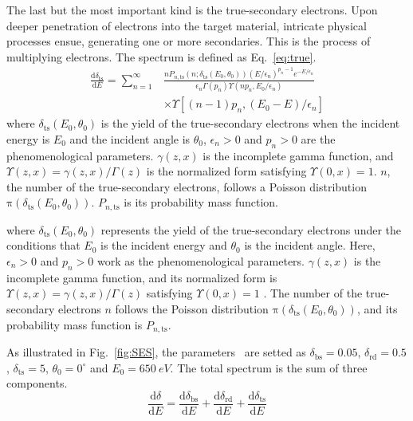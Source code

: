 The last but the most important kind is the true-secondary electrons.
Upon deeper penetration of electrons into the target material, intricate physical processes ensue,
generating one or more secondaries.
This is the process of multiplying electrons.
The spectrum is defined as Eq.~\eqref{eq:true}.
\begin{equation}
	\label{eq:true}
	\begin{aligned}
		\frac{\mathrm{d} \delta_{\mathrm{ts}}}{\mathrm{d} E} =  \sum_{n=1}^{\infty}
		 & \frac{n P_{n,\mathrm{ts}}\left(n; \delta_{\mathrm{ts}}(E_0,\theta_0)\right)
		\left(E / \epsilon_{n}\right)^{p_{n}-1} e^{-E / \epsilon_{n}}}
		{\epsilon_{n} \Gamma\left(p_{n}\right) \Upsilon\left(n p_{n}, E_0 / \epsilon_{n}\right)} \\
		 & \times \Upsilon\left[(n-1) p_{n},\left(E_0-E\right) / \epsilon_{n}\right]
	\end{aligned}
\end{equation}
where $\delta_{\mathrm{ts}}(E_0,\theta_0)$
is the yield of the true-secondary electrons when the incident energy is $E_0$ and the incident angle is $\theta_0$,
$\epsilon_{n}>0$ and $p_{n}>0$ are the phenomenological parameters.
$\gamma(z,x)$ is the incomplete gamma function,
and $\Upsilon(z,x)=\gamma(z,x)/\Gamma(z)$ is the normalized form satisfying $\Upsilon(0,x)=1$.
$n$, the number of the true-secondary electrons, follows a Poisson distribution~$\mathrm{\pi}(\delta_{\mathrm{ts}}(E_0,\theta_0))$.
$P_{n,\mathrm{ts}}$ is its probability mass function.

where $\delta_{\mathrm{ts}}(E_0,\theta_0)$ represents the yield of the true-secondary electrons under the conditions that $E_0$ is the incident energy and $\theta_0$ is the incident angle. Here, $\epsilon_{n}>0$ and $p_{n}>0$ work as the phenomenological parameters. $\gamma(z,x)$ is the incomplete gamma function, and its normalized form is $\Upsilon(z,x)=\gamma(z,x)/\Gamma(z)$ satisfying $\Upsilon(0,x)=1$ . The number of the true-secondary electrons $n$ follows the Poisson distribution $\mathrm{\pi}(\delta_{\mathrm{ts}}(E_0,\theta_0))$, and its probability mass function is $P_{n,\mathrm{ts}}$.

As illustrated in Fig.~\ref{fig:SES}, the parameters~\cite{2021Effects} are setted as
$\delta_{\mathrm{bs}}=0.05$, $\delta_{\mathrm{rd}}=0.5$, $\delta_{\mathrm{ts}}=5$,
$\theta_0=0^\circ$ and $E_0=\SI{650}{eV}$.
The total spectrum is the sum of three components.
\begin{equation}
	\frac{\mathrm{d}\delta}{\mathrm{d}E}=\frac{\mathrm{d}\delta_{\mathrm{bs}}}{\mathrm{d}E} + \frac{\mathrm{d}\delta_{\mathrm{rd}}}{\mathrm{d}E} + \frac{\mathrm{d}\delta_{\mathrm{ts}}}{\mathrm{d}E}
\end{equation}

